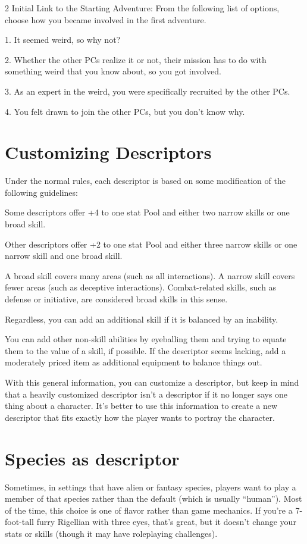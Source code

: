 \begin{multicols}{2}
Initial Link to the Starting Adventure: From the following list of options, choose how you became involved in the first adventure.

1. It seemed weird, so why not?

2. Whether the other PCs realize it or not, their mission has to do with something weird that you know about, so you got involved.

3. As an expert in the weird, you were specifically recruited by the other PCs.

4. You felt drawn to join the other PCs, but you don’t know why.

\section{Customizing Descriptors}

Under the normal rules, each descriptor is based on some modification of the following guidelines:

Some descriptors offer +4 to one stat Pool and either two narrow skills or one broad skill.

Other descriptors offer +2 to one stat Pool and either three narrow skills or one narrow skill and one broad skill.

A broad skill covers many areas (such as all interactions). A narrow skill covers fewer areas (such as deceptive interactions). Combat-related skills, such as defense or initiative, are considered broad skills in this sense.

Regardless, you can add an additional skill if it is balanced by an inability.

You can add other non-skill abilities by eyeballing them and trying to equate them to the value of a skill, if possible. If the descriptor seems lacking, add a moderately priced item as additional equipment to balance things out.

With this general information, you can customize a descriptor, but keep in mind that a heavily customized descriptor isn’t a descriptor if it no longer says one thing about a character. It’s better to use this information to create a new descriptor that fits exactly how the player wants to portray the character.

\section{Species as descriptor}

Sometimes, in settings that have alien or fantasy species, players want to play a member of that species rather than the default (which is usually “human”). Most of the time, this choice is one of flavor rather than game mechanics. If you’re a 7-foot-tall furry Rigellian with three eyes, that’s great, but it doesn’t change your stats or skills (though it may have roleplaying challenges).


\end{multicols}
